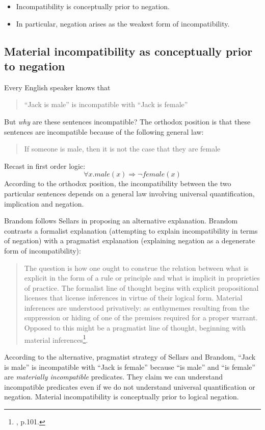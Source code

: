 \begin{itemize}

\item Incompatibility is conceptually prior to negation.

\item In particular, negation arises as the weakest form of incompatibility.

\end{itemize}

\subsection{Material incompatibility as conceptually prior to negation}

\NI Every English speaker knows that
\begin{quote}
``Jack is male'' is incompatible with ``Jack is female''
\end{quote}

\NI But \emph{why} are these sentences incompatible? The orthodox
position is that these sentences are incompatible because of the
following general law:
\begin{quote}
If someone is male, then it is not the case that they are female
\end{quote}
Recast in first order logic:
\[
\forall x. male(x) \Rightarrow \neg female(x)
\]
According to the orthodox position, the incompatibility between the
two particular sentences depends on a general law involving universal
quantification, implication and negation.

Brandom \cite{brandom2} follows Sellars in proposing an alternative explanation.
Brandom contrasts a formalist explanation (attempting to explain incompatibility in terms of negation) with a pragmatist explanation (explaining negation as a degenerate form of incompatibility):
\begin{quote}
The question is how one ought to construe the relation between what is explicit in the form of a rule or principle and what is implicit in proprieties of practice. 
The formalist line of thought begins with explicit propositional licenses that license inferences in virtue of their logical form. Material inferences are understood privatively: as enthymemes resulting from the suppression or hiding of one of the premises required for a proper warrant. 
Opposed to this might be a pragmatist line of thought, beginning with material inferences\footnote{\cite{brandom2}, p.101.}.
\end{quote}
According to the alternative, pragmatist strategy of Sellars and Brandom, ``Jack
is male'' is incompatible with ``Jack is female'' because ``is male''
and ``is female'' are \emph{materially incompatible} predicates.  They
claim we can understand incompatible predicates even if we do
not understand universal quantification or negation.  
Material incompatibility is conceptually prior to logical negation.

